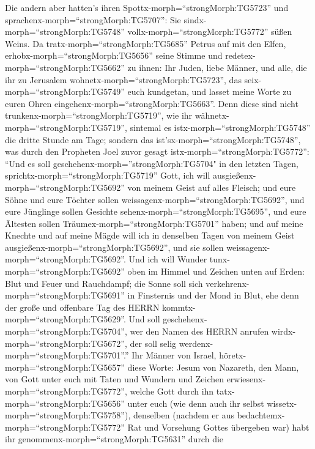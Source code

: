  Die andern aber hatten's ihren
Spottx-morph=``strongMorph:TG5723'' und
sprachenx-morph=``strongMorph:TG5707'': Sie
sindx-morph=``strongMorph:TG5748'' vollx-morph=``strongMorph:TG5772''
süßen Weins.  Da tratx-morph=``strongMorph:TG5685'' Petrus
auf mit den Elfen, erhobx-morph=``strongMorph:TG5656'' seine Stimme und
redetex-morph=``strongMorph:TG5662'' zu ihnen: Ihr Juden, liebe Männer,
und alle, die ihr zu Jerusalem wohnetx-morph=``strongMorph:TG5723'', das
seix-morph=``strongMorph:TG5749'' euch kundgetan, und lasset meine Worte
zu euren Ohren eingehenx-morph=``strongMorph:TG5663''. 
Denn diese sind nicht trunkenx-morph=``strongMorph:TG5719'', wie ihr
wähnetx-morph=``strongMorph:TG5719'', sintemal es
istx-morph=``strongMorph:TG5748'' die dritte Stunde am Tage;
 sondern das ist'sx-morph=``strongMorph:TG5748'', was durch
den Propheten Joel zuvor gesagt istx-morph=``strongMorph:TG5772'':
 ``Und es soll geschehenx-morph=''strongMorph:TG5704" in
den letzten Tagen, sprichtx-morph=``strongMorph:TG5719'' Gott, ich will
ausgießenx-morph=``strongMorph:TG5692'' von meinem Geist auf alles
Fleisch; und eure Söhne und eure Töchter sollen
weissagenx-morph=``strongMorph:TG5692'', und eure Jünglinge sollen
Gesichte sehenx-morph=``strongMorph:TG5695'', und eure Ältesten sollen
Träumex-morph=``strongMorph:TG5701'' haben;  und auf meine
Knechte und auf meine Mägde will ich in denselben Tagen von meinem Geist
ausgießenx-morph=``strongMorph:TG5692'', und sie sollen
weissagenx-morph=``strongMorph:TG5692''.  Und ich will
Wunder tunx-morph=``strongMorph:TG5692'' oben im Himmel und Zeichen
unten auf Erden: Blut und Feuer und Rauchdampf;  die Sonne
soll sich verkehrenx-morph=``strongMorph:TG5691'' in Finsternis und der
Mond in Blut, ehe denn der große und offenbare Tag des HERRN
kommtx-morph=``strongMorph:TG5629''.  Und soll
geschehenx-morph=``strongMorph:TG5704'', wer den Namen des HERRN anrufen
wirdx-morph=``strongMorph:TG5672'', der soll selig
werdenx-morph=``strongMorph:TG5701''.''  Ihr Männer von
Israel, höretx-morph=``strongMorph:TG5657'' diese Worte: Jesum von
Nazareth, den Mann, von Gott unter euch mit Taten und Wundern und
Zeichen erwiesenx-morph=``strongMorph:TG5772'', welche Gott durch ihn
tatx-morph=``strongMorph:TG5656'' unter euch (wie denn auch ihr selbst
wissetx-morph=``strongMorph:TG5758''),  denselben (nachdem
er aus bedachtemx-morph=``strongMorph:TG5772'' Rat und Vorsehung Gottes
übergeben war) habt ihr genommenx-morph=``strongMorph:TG5631'' durch die
